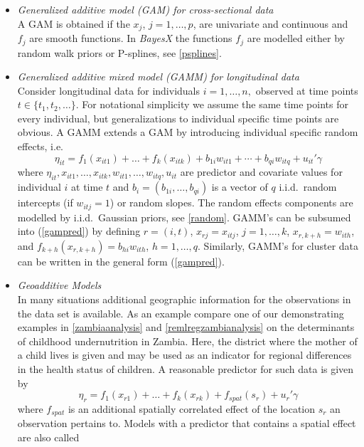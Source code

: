 \begin{itemize}
\item {\em Generalized additive model (GAM) for cross-sectional data} \\
A GAM is obtained if  the $x_j$, $j=1,\dots,p$, are univariate and
continuous and $f_j$ are smooth functions. In {\em BayesX} the
functions $f_j$ are modelled either by random walk priors or
P-splines, see \autoref{psplines}.
\item {\em Generalized additive mixed model (GAMM) for longitudinal data} \\
Consider longitudinal data for individuals $i=1,\dots,n,$ observed
at time points $t \in \{ t_1,t_2,\dots \}$. For notational
simplicity we assume the same time points for every individual,
but generalizations to individual specific time points are
obvious. A GAMM extends a GAM by introducing individual specific
random effects, i.e.
$$
\eta_{it} = f_1(x_{it1})+\dots+f_k(x_{itk}) + b_{1i} w_{it1}  +
\cdots + b_{qi} w_{itq}  + u_{it}'\gamma
$$
where
$\eta_{it},x_{it1},\dots,x_{itk},w_{it1},\dots,w_{itq},u_{it}$ are
predictor and covariate values for individual $i$ at time $t$ and
$b_i=(b_{1i},\dots,b_{qi})$ is a vector of $q$ i.i.d.~random
intercepts (if $w_{itj} = 1$) or random slopes. The random effects
components are modelled by i.i.d.~Gaussian priors, see
\autoref{random}. GAMM's can be subsumed into (\ref{gampred}) by
defining $r=(i,t)$, $x_{rj} = x_{itj}$, $j=1,\dots,k$, $x_{r,k+h}
= w_{ith}$, and $f_{k+h}(x_{r,k+h}) = b_{hi} w_{ith}$,
$h=1,\dots,q$. Similarly, GAMM's for cluster data can be written
in the general form (\ref{gampred}).
\item {\em Geoadditive Models} \\
In many situations additional geographic information for the
observations in the data set is available. As an example compare
one of our demonstrating examples in \autoref{zambiaanalysis} and
\autoref{remlregzambianalysis} on the determinants of childhood
undernutrition in Zambia. Here, the district where the mother of a
child lives is given and may be used as an indicator for regional
differences in the health status of children. A reasonable
predictor for such data is given by
\begin{equation}
\eta_{r} = f_1(x_{r1})+\dots+f_k(x_{rk}) + f_{spat}(s_{r}) + u_r'
\gamma
\end{equation}
where $f_{spat}$ is an additional spatially correlated effect of
the location $s_{r}$ an observation pertains to. Models with a
predictor that contains a spatial effect are also called

\end{itemize}
